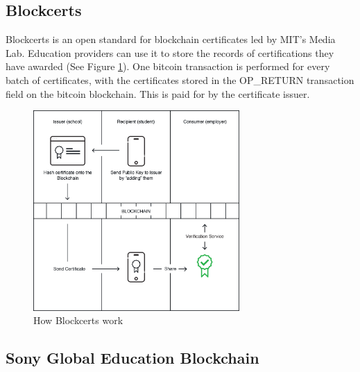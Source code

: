 
\subsection{Blockcerts}

Blockcerts is an open standard for blockchain certificates led by MIT’s Media Lab. Education providers can use it to store 
the records of certifications they have awarded (See Figure \ref{fig:blockcerts}). One bitcoin transaction is performed for 
every batch of certificates, with the certificates stored in the OP\_RETURN transaction field on the bitcoin blockchain. 
This is paid for by the certificate issuer. \citep{blockcerts2018}

\begin{figure}[!ht] 
    \centering    
    \includegraphics[width=0.7\textwidth]{blockcerts}
    \caption[How Blockcerts work]
        {How Blockcerts work \citep{blockcerts2018}}
    \label{fig:blockcerts}
\end{figure}

\subsection{Sony Global Education Blockchain}%

